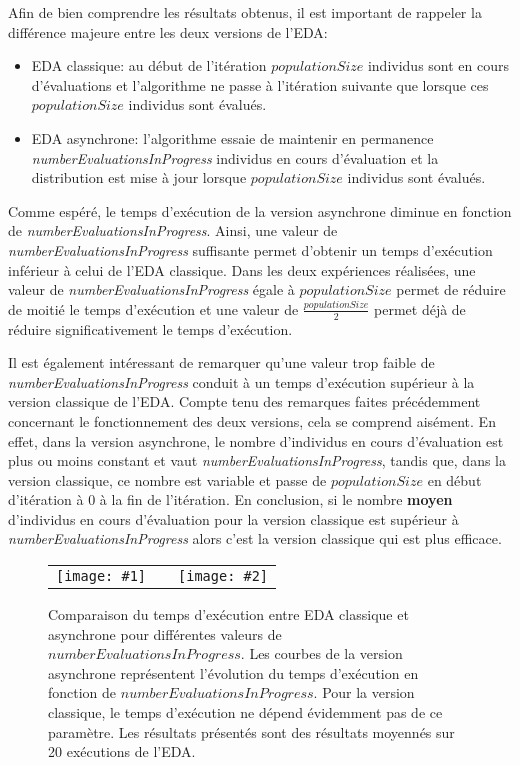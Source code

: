 \documentclass[a4paper, 12pt]{report}
\newcommand{\twocurves}[2]{
 \begin{tabular}{lcr}
  \hspace{-30pt} 
  \texttt{[image: \#1]} 
  & \hspace{-65pt} & 
  \texttt{[image: \#2]} \\
 \end{tabular}
 \vspace{-10pt}
}
\begin{document}
Afin de bien comprendre les résultats obtenus, il est important de rappeler la différence majeure entre les deux versions de l'EDA:
\begin{itemize}
\item EDA classique: au début de l'itération $populationSize$ individus sont en cours d'évaluations et l'algorithme ne passe à l'itération suivante que lorsque ces $populationSize$ individus sont évalués.
\item EDA asynchrone: l'algorithme essaie de maintenir en permanence \textit{numberEvaluationsInProgress} individus en cours d'évaluation et la distribution est mise à jour lorsque $populationSize$ individus sont évalués.
\end{itemize}

Comme espéré, le temps d'exécution de la version asynchrone diminue en fonction de \textit{numberEvaluationsInProgress}. Ainsi, une valeur de \textit{numberEvaluationsInProgress} suffisante permet d'obtenir un temps d'exécution inférieur à celui de l'EDA classique. Dans les deux expériences réalisées, une valeur de \textit{numberEvaluationsInProgress} égale à $populationSize$ permet de réduire de moitié le temps d'exécution et une valeur de $\frac{populationSize}{2}$ permet déjà de réduire significativement le temps d'exécution. 

Il est également intéressant de remarquer qu'une valeur trop faible de \textit{numberEvaluationsInProgress} conduit à un temps d'exécution supérieur à la version classique de l'EDA. Compte tenu des remarques faites précédemment concernant le fonctionnement des deux versions, cela se comprend aisément. En effet, dans la version asynchrone, le nombre d'individus en cours d'évaluation est plus ou moins constant et vaut \textit{numberEvaluationsInProgress}, tandis que, dans la version classique, ce nombre est variable et passe de $populationSize$ en début d'itération à $0$ à la fin de l'itération. En conclusion, si le nombre \textbf{moyen} d'individus en cours d'évaluation pour la version classique est supérieur à \textit{numberEvaluationsInProgress} alors c'est la version classique qui est plus efficace.


\begin{figure}[!tb]
\twocurves{./data/time_f13.pdf}{./data/time_f14.pdf}
\caption{Comparaison du temps d'exécution entre EDA classique et asynchrone pour différentes valeurs de $numberEvaluationsInProgress$. Les courbes de la version asynchrone représentent l'évolution du temps d'exécution en fonction de $numberEvaluationsInProgress$. Pour la version classique, le temps d'exécution ne dépend évidemment pas de ce paramètre. Les résultats présentés sont des résultats moyennés sur 20 exécutions de l'EDA.}
\label{compare_time_eda_async}
\end{figure}
\newpage
\end{document}
